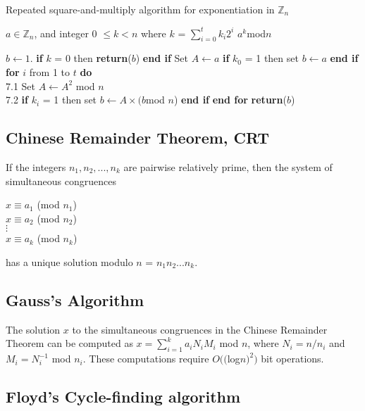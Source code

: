 \documentclass[iwp,first]{luthesis}
\begin{document}
\begin{algorithm}
\caption{Repeated square-and-multiply algorithm for exponentiation in $\mathbb{Z}_n$}
\begin{algorithmic}
\REQUIRE $a \in \mathbb{Z}_n$, and integer 0 $\leq k < n$ where $k$ = $\displaystyle\sum\nolimits_{i = 0}^t k_{i}2^i$
\ENSURE $a^{k}$mod$n$
\begin{enumerate}
\STATE $b \leftarrow 1$. 
\STATE \textbf{if} $k$ = 0 then \textbf{return}($b$)
\STATE \textbf{end if}
\STATE Set $A \leftarrow a$
\STATE \textbf{if} $k_0$ = 1 then set $b \leftarrow a$
\STATE \textbf{end if}
\STATE \textbf{for} $i$ from 1 to $t$ \textbf{do}
\\		
7.1 Set $A \leftarrow A^2$ mod $n$
\\
7.2 \textbf{if} $k_i$ = 1 then set $b \leftarrow A \times (b$mod $n$)
\STATE \textbf{end if}
\STATE \textbf{end for}
\STATE \textbf{return}($b$)
\end{enumerate}
\end{algorithmic}
\end{algorithm}

\subsection{Chinese Remainder Theorem, CRT}

 If the integers $n_1, n_2, ... , n_k$ are pairwise relatively prime, then the system of simultaneous congruences

\begin{center}
$x \equiv a_1$ (mod $n_1$)
\\
$x \equiv a_2$ (mod $n_2$)
\\
$\vdots$
\\
$x \equiv a_k$ (mod $n_k$)
\end{center}

has a unique solution modulo $n$ = $n_{1}n_{2}...n_{k}$.

\subsection{Gauss's Algorithm}

 The solution $x$ to the simultaneous congruences in the Chinese Remainder Theorem can be computed as $x = \displaystyle\sum\nolimits_{i = 1}^k a_{i}N_{i}M_{i}$ mod $n$, where $N_{i} = n/n_{i}$ and $M_{i} = N_{i}^{-1}$ mod $n_i$. These computations require $O(($log$n)^2)$ bit operations.

\subsection{Floyd's Cycle-finding algorithm}
\end{document}
